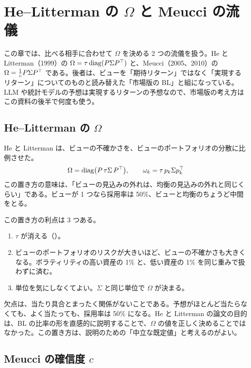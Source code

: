\chapter{He--Litterman の $\Omega$ と Meucci の流儀}\label{ch:hlmeucci}

この章では、比べる相手に合わせて $\Omega$ を決める 2 つの流儀を扱う。He と Litterman（1999）の $\Omega=\tau\operatorname{diag}(P\Sigma P^{\top})$ と、Meucci（2005、2010）の $\Omega=\frac1c P\Sigma P^{\top}$ である。後者は、ビューを「期待リターン」ではなく「実現するリターン」についてのものと読み替えた「市場版の BL」と組になっている。LLM や統計モデルの予想は実現するリターンの予想なので、市場版の考え方はこの資料の後半で何度も使う。

\section{He--Litterman の $\Omega$}

He と Litterman は、ビューの不確かさを、ビューのポートフォリオの分散に比例させた。
\begin{equation}
\Omega=\operatorname{diag}\bigl(P\,\tau\Sigma\,P^{\top}\bigr),\qquad \omega_k=\tau\,p_k\Sigma p_k^{\top}
\label{eq:hl-omega}
\end{equation}
この置き方の意味は、「ビューの見込みの外れは、均衡の見込みの外れと同じくらい」である。ビューが 1 つなら採用率は 50\%、ビューと均衡のちょうど中間をとる。

この置き方の利点は 3 つある。

\begin{enumerate}
\item $\tau$ が消える（）。
\item ビューのポートフォリオのリスクが大きいほど、ビューの不確かさも大きくなる。ボラティリティの高い資産の 1\% と、低い資産の 1\% を同じ重みで扱わずに済む。
\item 単位を気にしなくてよい。$\Sigma$ と同じ単位で $\Omega$ が決まる。
\end{enumerate}

欠点は、当たり具合とまったく関係がないことである。予想がほとんど当たらなくても、よく当たっても、採用率は 50\% になる。He と Litterman の論文の目的は、BL の比率の形を直感的に説明することで、$\Omega$ の値を正しく決めることではなかった。この置き方は、説明のための「中立な既定値」と考えるのがよい。

\section{Meucci の確信度 $c$}

